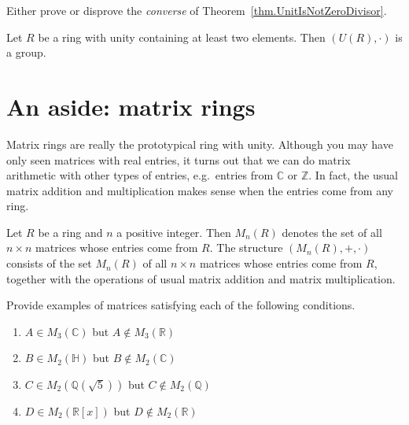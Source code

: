 \begin{problem}
Either prove or disprove the \emph{converse} of Theorem~\ref{thm.UnitIsNotZeroDivisor}.
\end{problem}

\begin{theorem}\label{thm.UnitsFormGroup}
Let $R$ be a ring with unity containing at least two elements. Then $(U(R),\cdot)$ is a group.
\end{theorem}


\section{An aside: matrix rings}

Matrix rings are really the prototypical ring with unity. Although you may have only seen matrices with real entries, it turns out that we can do matrix arithmetic with other types of entries, e.g.~entries from $\mathbb{C}$ or $\mathbb{Z}$. In fact, the usual matrix addition and multiplication makes sense when the entries come from any ring.

\begin{definition}
Let $R$ be a ring and $n$ a positive integer. Then $M_{n}(R)$ denotes the set of all $n\times n$ matrices whose entries come from $R$. The structure $(M_{n}(R),+,\cdot)$ consists of the set $M_{n}(R)$ of all $n\times n$ matrices whose entries come from $R$, together with the operations of usual matrix addition and matrix multiplication. 
\end{definition}

\begin{problem}
Provide examples of matrices satisfying each of the following conditions.
\begin{multicols}{2}
\begin{enumerate}
\item $A\in M_{3}(\mathbb{C})$ but $A\notin M_{3}(\mathbb{R})$
\item $B\in M_{2}(\mathbb{H})$ but $B\notin M_{2}(\mathbb{C})$
\item $C\in M_{2}\left(\mathbb{Q}\left(\sqrt{5}\right)\right)$ but $C\notin M_{2}(\mathbb{Q})$
\item $D\in M_{2}\left(\mathbb{R}[x]\right)$ but $D\notin M_{2}(\mathbb{R})$
\end{enumerate}
\end{multicols}
\end{problem}

